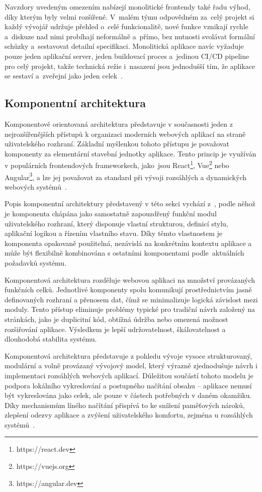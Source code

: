 Navzdory uvedeným omezením nabízejí monolitické frontendy také řadu
výhod, díky kterým byly velmi rozšířené. V~malém týmu odpovědném
za~celý projekt si každý vývojář udržuje přehled o~celé funkcionalitě, nové funkce vznikají rychle a~diskuze nad nimi probíhají neformálně a~přímo, bez nutnosti svolávat formální schůzky a~sestavovat detailní specifikaci. Monolitická aplikace navíc vyžaduje pouze jeden aplikační server, jeden buildovací proces a~jedinou CI/CD pipeline pro celý projekt, takže technická režie i~nasazení jsou jednodušší tím, že aplikace se sestaví a~zveřejní jako jeden celek~\cite{MicrofrontensGeers}.

\subsection{Komponentní architektura}
\label{Komponentni}
Komponentově orientovaná architektura představuje v současnosti jeden z nejrozšířenějších přístupů k organizaci moderních webových aplikací na straně uživatelského rozhraní. Základní myšlenkou tohoto přístupu je považovat komponenty za elementární stavební jednotky aplikace. Tento princip je využíván v populárních frontendových frameworkech, jako~jsou React\footnote{https://react.dev}, Vue\footnote{https://vuejs.org} nebo Angular\footnote{https://angular.dev}, a lze jej považovat za standard při vývoji rozsáhlých a dynamických webových systémů~\cite{ComponentArch}.

Popis komponentní architektury představený v této sekci vychází z~\cite{ComponentArch}, podle něhož je komponenta chápána jako samostatně zapouzdřený funkční modul uživatelského rozhraní, který disponuje vlastní strukturou, definicí stylu, aplikační logikou a řízením vlastního stavu. Díky těmto vlastnostem je komponenta opakovaně použitelná, nezávislá na konkrétním kontextu aplikace a může být flexibilně kombinována s ostatními komponentami podle~aktuálních požadavků systému.

Komponentová architektura rozděluje webovou aplikaci na množství provázaných funkčních celků. Jednotlivé komponenty spolu komunikují prostřednictvím jasně definovaných rozhraní a přenosem dat, čímž se minimalizuje logická závislost mezi moduly. Tento přístup eliminuje problémy typické pro tradiční návrh založený na stránkách, jako je duplicitní kód, obtížná údržba nebo omezená možnost rozšiřování aplikace. Výsledkem je lepší udržovatelnost, škálovatelnost a dlouhodobá stabilita systému.

Komponentová architektura představuje z pohledu vývoje vysoce strukturovaný, modulární a volně provázaný vývojový model, který výrazně zjednodušuje návrh i implementaci rozsáhlých webových aplikací. Důležitou součástí tohoto modelu je podpora lokálního vykreslování a postupného načítání obsahu -- aplikace nemusí být vykreslována jako celek, ale pouze v částech potřebných v daném okamžiku. Díky mechanismům líného načítání přispívá to ke snížení paměťových nároků, zlepšení odezvy aplikace a zvýšení uživatelského komfortu, zejména 
u rozsáhlých systémů~\cite{ComponentArch}.

